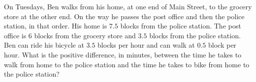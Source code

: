 On Tuesdays, Ben walks from his home, at one end of Main Street, to the grocery store at the other end. On the way he passes the post office and then the police station, in that order. His home is $7.5$ blocks from the police station. The post office is $6$ blocks from the grocery store and $3.5$ blocks from the police station. Ben can ride his bicycle at $3.5$ blocks per hour and can walk at $0.5$ block per hour. What is the positive difference, in minutes, between the time he takes to walk from home to the police station and the time he takes to bike from home to the police station?

